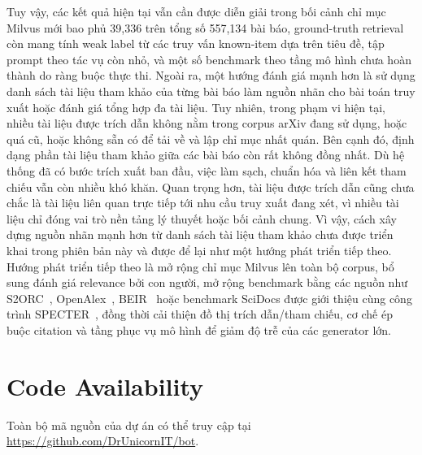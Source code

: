 \documentclass[conference]{IEEEtran}
\begin{document}
Tuy vậy, các kết quả hiện tại vẫn cần được diễn giải trong bối cảnh chỉ mục Milvus mới bao phủ 39,336 trên tổng số 557,134 bài báo, ground-truth retrieval còn mang tính weak label từ các truy vấn known-item dựa trên tiêu đề, tập prompt theo tác vụ còn nhỏ, và một số benchmark theo tầng mô hình chưa hoàn thành do ràng buộc thực thi. Ngoài ra, một hướng đánh giá mạnh hơn là sử dụng danh sách tài liệu tham khảo của từng bài báo làm nguồn nhãn cho bài toán truy xuất hoặc đánh giá tổng hợp đa tài liệu. Tuy nhiên, trong phạm vi hiện tại, nhiều tài liệu được trích dẫn không nằm trong corpus arXiv đang sử dụng, hoặc quá cũ, hoặc không sẵn có để tải về và lập chỉ mục nhất quán. Bên cạnh đó, định dạng phần tài liệu tham khảo giữa các bài báo còn rất không đồng nhất. Dù hệ thống đã có bước trích xuất ban đầu, việc làm sạch, chuẩn hóa và liên kết tham chiếu vẫn còn nhiều khó khăn. Quan trọng hơn, tài liệu được trích dẫn cũng chưa chắc là tài liệu liên quan trực tiếp tới nhu cầu truy xuất đang xét, vì nhiều tài liệu chỉ đóng vai trò nền tảng lý thuyết hoặc bối cảnh chung. Vì vậy, cách xây dựng nguồn nhãn mạnh hơn từ danh sách tài liệu tham khảo chưa được triển khai trong phiên bản này và được để lại như một hướng phát triển tiếp theo. Hướng phát triển tiếp theo là mở rộng chỉ mục Milvus lên toàn bộ corpus, bổ sung đánh giá relevance bởi con người, mở rộng benchmark bằng các nguồn như S2ORC~\cite{lo2020s2orc}, OpenAlex~\cite{priem2022openalex}, BEIR~\cite{thakur2021beir} hoặc benchmark SciDocs được giới thiệu cùng công trình SPECTER~\cite{cohan2020specter}, đồng thời cải thiện đồ thị trích dẫn/tham chiếu, cơ chế ép buộc citation và tầng phục vụ mô hình để giảm độ trễ của các generator lớn.

\section*{Code Availability}

Toàn bộ mã nguồn của dự án có thể truy cập tại \url{https://github.com/DrUnicornIT/bot}.

\balance


\end{document}
